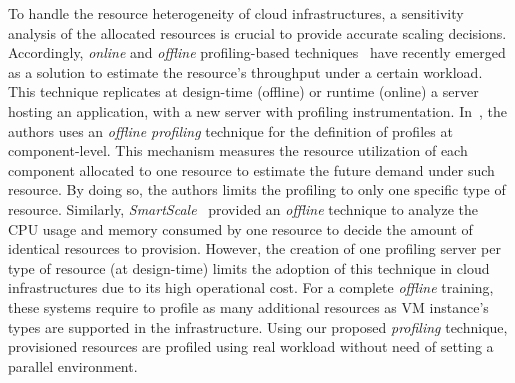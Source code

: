 To handle the resource heterogeneity of cloud infrastructures, a sensitivity analysis of the allocated resources is crucial to provide accurate scaling decisions. Accordingly, \emph{online} and \emph{offline} profiling-based techniques~\cite{kaviani_profiling-as--service:_2011} have recently emerged as a solution to  estimate the resource's throughput under a certain workload. This technique replicates at design-time (offline) or runtime (online) a server hosting an application, with a new server with profiling instrumentation. In~\cite{roy_2011}, the authors uses an \emph{offline profiling} technique for the definition of profiles at component-level. This mechanism measures the resource utilization of each component allocated to one resource to estimate the future demand under such resource. By doing so, the authors limits the profiling to only one specific type of resource. Similarly, \emph{SmartScale}~\cite{smartscale_2012} provided an \emph{offline} technique to analyze the CPU usage and memory consumed by one resource to decide the amount of identical resources to provision. However, the creation of one profiling server per type of resource (at design-time) limits the adoption of this technique in cloud infrastructures due to its high operational cost. For a complete \emph{offline} training, these systems require to profile as many additional resources as VM instance's types are supported in the infrastructure. Using our proposed \emph{profiling} technique, provisioned resources are profiled using real workload without need of setting a parallel environment.


